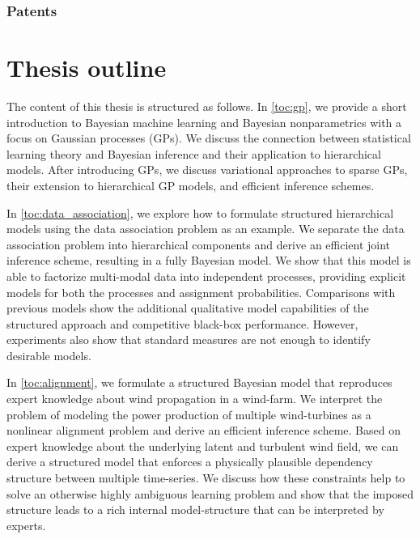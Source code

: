 \subsubsection{Patents}


\section{Thesis outline}
The content of this thesis is structured as follows.
In \cref{toc:gp}, we provide a short introduction to Bayesian machine learning and Bayesian nonparametrics with a focus on Gaussian processes (GPs).
We discuss the connection between statistical learning theory and Bayesian inference and their application to hierarchical models.
After introducing GPs, we discuss variational approaches to sparse GPs, their extension to hierarchical GP models, and efficient inference schemes.

In \cref{toc:data_association}, we explore how to formulate structured hierarchical models using the data association problem as an example.
We separate the data association problem into hierarchical components and derive an efficient joint inference scheme, resulting in a fully Bayesian model.
We show that this model is able to factorize multi-modal data into independent processes, providing explicit models for both the processes and assignment probabilities.
Comparisons with previous models show the additional qualitative model capabilities of the structured approach and competitive black-box performance.
However, experiments also show that standard measures are not enough to identify desirable models.

In \cref{toc:alignment}, we formulate a structured Bayesian model that reproduces expert knowledge about wind propagation in a wind-farm.
We interpret the problem of modeling the power production of multiple wind-turbines as a nonlinear alignment problem and derive an efficient inference scheme.
Based on expert knowledge about the underlying latent and turbulent wind field, we can derive a structured model that enforces a physically plausible dependency structure between multiple time-series.
We discuss how these constraints help to solve an otherwise highly ambiguous learning problem and show that the imposed structure leads to a rich internal model-structure that can be interpreted by experts.

